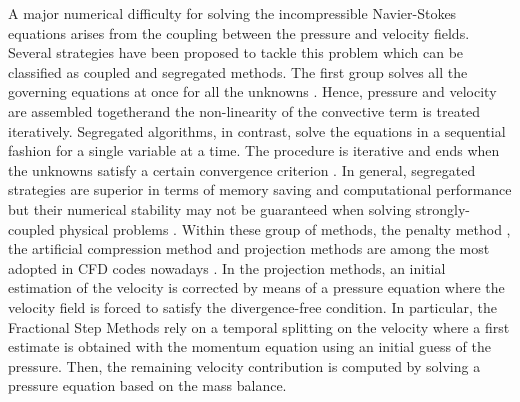 \documentclass[final,3p,times,11pt,onecolumn]{myElsarticle}
\numberwithin{equation}{section}
\begin{document}
A major numerical difficulty for solving the incompressible Navier-Stokes equations arises from the coupling between
the pressure and velocity fields. Several strategies have been proposed to tackle this problem which can
be classified as coupled and segregated methods. The first group solves all the governing
equations at once for all the unknowns \cite{mazhar1, mazhar2, chen, darwish1, darwish2, uroic}. Hence, pressure and velocity are assembled togetherand the non-linearity of the convective term is treated iteratively. Segregated algorithms, in contrast, solve the equations in a sequential fashion for a single variable at a time. The procedure is iterative and ends when the unknowns satisfy a certain convergence criterion \cite{ferziger, versteeg, moukalled}. In general, segregated strategies are superior in terms of memory saving and computational performance but their numerical stability may not be guaranteed when solving strongly-coupled physical problems \cite{wang2, uroic}. Within these group of methods, the penalty method \cite{temam1968methode}, the artificial compression method \cite{harten1977artificial} and projection methods \cite{chorin1, chorin2, temam1968methode} are among the most adopted in CFD codes nowadays \cite{wang2}. In the projection methods, an initial estimation of the velocity is corrected by means of a pressure equation where the velocity field is forced to satisfy the divergence-free condition. In particular, the Fractional Step Methods \cite{kim} rely on a temporal splitting on the velocity where a first estimate is obtained with the momentum equation using an initial guess of the pressure. Then, the remaining velocity contribution is computed by solving a pressure equation based on the mass balance.
\end{document}
